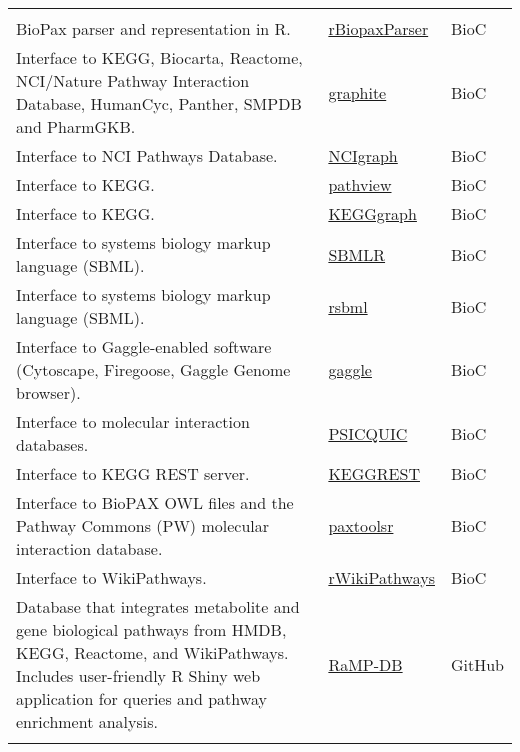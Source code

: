 \documentclass[]{article}
\begin{document}
\begin{longtable}{>{\raggedright\arraybackslash}p{30em}>{\raggedright\arraybackslash}p{10em}>{\raggedright\arraybackslash}p{3em}}
\rowcolor{gray!6}  \addlinespace[0.3em]
\multicolumn{3}{l}{\textbf{Pathway resources and interfaces}}\\
BioPax parser and representation in R. & \href{https://www.bioconductor.org/packages/release/bioc/html/rBiopaxParser.html}{rBiopaxParser} & BioC\\
Interface to KEGG, Biocarta, Reactome, NCI/Nature Pathway Interaction Database, HumanCyc, Panther, SMPDB and PharmGKB. & \href{http://bioconductor.org/packages/release/bioc/html/graphite.html}{graphite} & BioC\\
\rowcolor{gray!6}  Interface to NCI Pathways Database. & \href{https://www.bioconductor.org/packages/release/bioc/html/NCIgraph.html}{NCIgraph} & BioC\\
Interface to KEGG. & \href{https://bioconductor.org/packages/release/bioc/html/pathview.html}{pathview} & BioC\\
\rowcolor{gray!6}  Interface to KEGG. & \href{https://www.bioconductor.org/packages/release/bioc/html/KEGGgraph.html}{KEGGgraph} & BioC\\
Interface to systems biology markup language (SBML). & \href{https://www.bioconductor.org/packages/release/bioc/html/SBMLR.html}{SBMLR} & BioC\\
\rowcolor{gray!6}  Interface to systems biology markup language (SBML). & \href{https://bioconductor.org/packages/release/bioc/html/rsbml.html}{rsbml} & BioC\\
Interface to Gaggle-enabled software (Cytoscape, Firegoose, Gaggle Genome browser). & \href{https://bioconductor.org/packages/release/bioc/html/gaggle.html}{gaggle} & BioC\\
\rowcolor{gray!6}  Interface to molecular interaction databases. & \href{https://www.bioconductor.org/packages/release/bioc/html/PSICQUIC.html}{PSICQUIC} & BioC\\
Interface to KEGG REST server. & \href{http://bioconductor.org/packages/release/bioc/html/KEGGREST.html}{KEGGREST} & BioC\\
\rowcolor{gray!6}  Interface to BioPAX OWL files and the Pathway Commons (PW) molecular interaction database. & \href{http://bioconductor.org/packages/release/bioc/html/paxtoolsr.html}{paxtoolsr} & BioC\\
Interface to WikiPathways. & \href{https://bioconductor.org/packages/release/bioc/html/rWikiPathways.html}{rWikiPathways} & BioC\\
\rowcolor{gray!6}  Database that integrates metabolite and gene biological pathways from HMDB, KEGG, Reactome, and WikiPathways. Includes user-friendly R Shiny web application for queries and pathway enrichment analysis. & \href{https://github.com/Mathelab/RaMP-DB/}{RaMP-DB} & GitHub\\*
\end{longtable}
\end{document}
